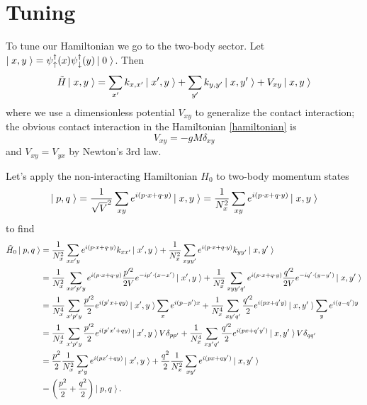 \section{Tuning}\label{sec:tuning}

To tune our Hamiltonian we go to the two-body sector.
Let $\left|\;x,y\;\right\rangle = \psi{}^{\dagger}_{\uparrow}(x) \psi{}^{\dagger}_{\downarrow}(y) \left|\;0\;\right\rangle$.
Then
\begin{equation}
    \tilde{H} \left|\;x,y\;\right\rangle = \sum_{x'} k_{x,x'}\left|\;x',y\;\right\rangle + \sum_{y'} k_{y,y'}\left|\;x,y'\;\right\rangle + V_{xy} \left|\;x,y\;\right\rangle
\end{equation}
where we use a dimensionless potential $V_{xy}$ to generalize the contact interaction;
the obvious contact interaction in the Hamiltonian \eqref{hamiltonian} is
\begin{equation}
    V_{xy} = - gM \delta_{xy}
\end{equation}
and $V_{xy}=V_{yx}$ by Newton's 3rd law.

Let's apply the non-interacting Hamiltonian $H_0$ to two-body momentum states
\begin{equation}
    \left|\;p,q\;\right\rangle 
    =
    \frac{1}{\sqrt{V}^2}\sum_{xy} e^{i(p\cdot x + q \cdot y)} \left|\;x,y\;\right\rangle
    =
    \frac{1}{N_x^2}\sum_{xy} e^{i(p\cdot x + q \cdot y)} \left|\;x,y\;\right\rangle
\end{equation}
to find
\begin{align}
    \tilde{H}_0 \left|\;p,q\;\right\rangle
    &=
            \frac{1}{N_x^2} \sum_{xx'y} e^{i(p\cdot x + q \cdot y)} k_{xx'}\left|\;x',y\;\right\rangle
        +   \frac{1}{N_x^2} \sum_{xyy'} e^{i(p\cdot x + q \cdot y)} k_{yy'}\left|\;x,y'\;\right\rangle
    \\
    &=
            \frac{1}{N_x^2} \sum_{xx'p'y} e^{i(p\cdot x + q \cdot y)} \frac{p'^2}{2V} e^{-i p'\cdot(x-x')}\left|\;x',y\;\right\rangle
        +   \frac{1}{N_x^2} \sum_{xyy'q'} e^{i(p\cdot x + q \cdot y)} \frac{q'^2}{2V} e^{-i q'\cdot(y-y')}\left|\;x,y'\;\right\rangle
    \\
    &=
            \frac{1}{N_x^4} \sum_{x'p'y} \frac{p'^2}{2} e^{i(p'x+qy)} \left|\;x',y\;\right\rangle \sum_{x} e^{i(p-p')x}
        +   \frac{1}{N_x^4} \sum_{xy'q'} \frac{q'^2}{2} e^{i(px+q'y)} \left|\;x,y'\;\right\rangle \sum_{y} e^{i(q-q')y}
    \\
    &=
            \frac{1}{N_x^4} \sum_{x'p'y} \frac{p'^2}{2} e^{i(p'x'+qy)} \left|\;x',y\;\right\rangle V \delta_{pp'}
        +   \frac{1}{N_x^4} \sum_{xy'q'} \frac{q'^2}{2} e^{i(px+q'y')} \left|\;x,y'\;\right\rangle V \delta_{qq'}
    \\
    &=
            \frac{p^2}{2} \frac{1}{N_x^2}\sum_{x'y} e^{i(px'+qy)} \left|\;x',y\;\right\rangle
        +   \frac{q^2}{2} \frac{1}{N_x^2}\sum_{xy'} e^{i(px+qy')} \left|\;x,y'\;\right\rangle
    \\
    &=
        \left(\frac{p^2}{2} + \frac{q^2}{2}\right) \left|\;p,q\;\right\rangle.
\end{align}

